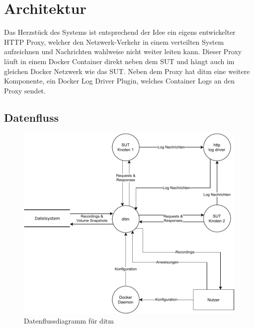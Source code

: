 \documentclass[12pt,a4paper]{report}
\begin{document}
\section{Architektur}
Das Herzstück des Systems ist entsprechend der Idee ein eigens entwickelter HTTP Proxy, welcher den Netzwerk-Verkehr in
einem verteilten System aufzeichnen und Nachrichten wahlweise nicht weiter leiten kann. Dieser Proxy läuft in einem
Docker Container direkt neben dem SUT und hängt auch im gleichen Docker Netzwerk wie das SUT. Neben dem Proxy hat
ditm eine weitere Komponente, ein Docker Log Driver Plugin, welches Container Logs an den Proxy sendet.
\subsection{Datenfluss}
\begin{figure}[H]
	\centering
    \includegraphics[width=\linewidth]{img/ditm-Dataflow.pdf}
    \caption{Datenflussdiagramm für ditm}
    \label{fig:dataflow}
\end{figure}
\end{document}
